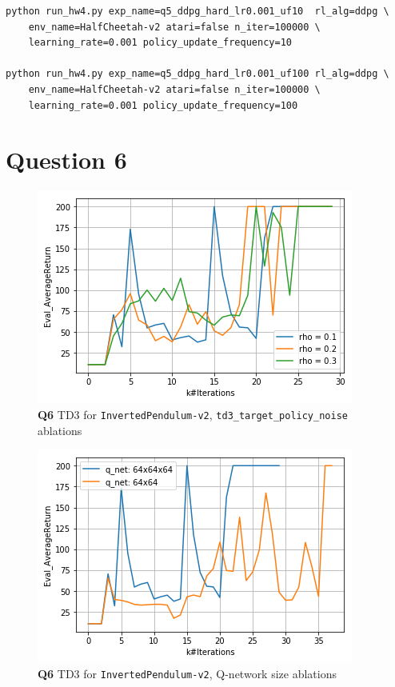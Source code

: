 \documentclass[11pt]{article}
\begin{document}
\begin{verbatim}
python run_hw4.py exp_name=q5_ddpg_hard_lr0.001_uf10  rl_alg=ddpg \
    env_name=HalfCheetah-v2 atari=false n_iter=100000 \
    learning_rate=0.001 policy_update_frequency=10

python run_hw4.py exp_name=q5_ddpg_hard_lr0.001_uf100 rl_alg=ddpg \
    env_name=HalfCheetah-v2 atari=false n_iter=100000 \
    learning_rate=0.001 policy_update_frequency=100
\end{verbatim}

\clearpage


\section{Question 6}
\label{sec:orgc5786a7}

\begin{figure}[htbp]
\centering
\includegraphics[width=.9\linewidth]{./61.png}
\caption{\textbf{Q6} TD3 for \texttt{InvertedPendulum-v2}, \texttt{td3\_target\_policy\_noise} ablations}
\end{figure}


\begin{figure}[htbp]
\centering
\includegraphics[width=.9\linewidth]{./62.png}
\caption{\textbf{Q6} TD3 for \texttt{InvertedPendulum-v2}, Q-network size ablations}
\end{figure}
\end{document}

